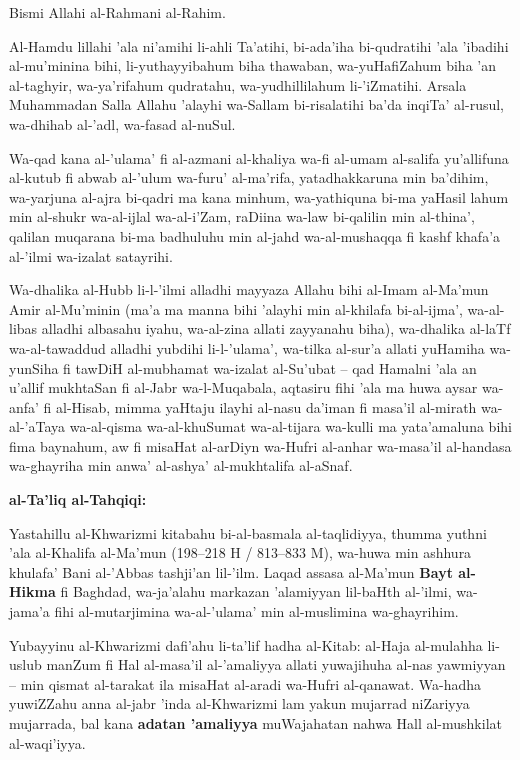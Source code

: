 \documentclass[11pt,a4paper]{book}
\begin{document}
\begin{originaltext}
Bismi Allahi al-Rahmani al-Rahim.

Al-Hamdu lillahi 'ala ni'amihi li-ahli Ta'atihi, bi-ada'iha bi-qudratihi
'ala 'ibadihi al-mu'minina bihi, li-yuthayyibahum biha thawaban,
wa-yuHafiZahum biha 'an al-taghyir, wa-ya'rifahum qudratahu,
wa-yudhillilahum li-'iZmatihi. Arsala Muhammadan Salla Allahu 'alayhi
wa-Sallam bi-risalatihi ba'da inqiTa' al-rusul, wa-dhihab al-'adl,
wa-fasad al-nuSul.

Wa-qad kana al-'ulama' fi al-azmani al-khaliya wa-fi al-umam al-salifa
yu'allifuna al-kutub fi abwab al-'ulum wa-furu' al-ma'rifa, yatadhakkaruna
min ba'dihim, wa-yarjuna al-ajra bi-qadri ma kana minhum, wa-yathiquna
bi-ma yaHasil lahum min al-shukr wa-al-ijlal wa-al-i'Zam, raDiina
wa-law bi-qalilin min al-thina', qalilan muqarana bi-ma badhuluhu min
al-jahd wa-al-mushaqqa fi kashf khafa'a al-'ilmi wa-izalat satayrihi.

Wa-dhalika al-Hubb li-l-'ilmi alladhi mayyaza Allahu bihi al-Imam
al-Ma'mun Amir al-Mu'minin (ma'a ma manna bihi 'alayhi min al-khilafa
bi-al-ijma', wa-al-libas alladhi albasahu iyahu, wa-al-zina allati
zayyanahu biha), wa-dhalika al-laTf wa-al-tawaddud alladhi yubdihi
li-l-'ulama', wa-tilka al-sur'a allati yuHamiha wa-yunSiha fi tawDiH
al-mubhamat wa-izalat al-Su'ubat -- qad Hamalni 'ala an u'allif
mukhtaSan fi al-Jabr wa-l-Muqabala, aqtasiru fihi 'ala ma huwa aysar
wa-anfa' fi al-Hisab, mimma yaHtaju ilayhi al-nasu da'iman fi masa'il
al-mirath wa-al-'aTaya wa-al-qisma wa-al-khuSumat wa-al-tijara wa-kulli
ma yata'amaluna bihi fima baynahum, aw fi misaHat al-arDiyn wa-Hufri
al-anhar wa-masa'il al-handasa wa-ghayriha min anwa' al-ashya'
al-mukhtalifa al-aSnaf.
\end{originaltext}

\begin{commentary}
\textbf{al-Ta'liq al-Tahqiqi:}

Yastahillu al-Khwarizmi kitabahu bi-al-basmala al-taqlidiyya, thumma
yuthni 'ala al-Khalifa al-Ma'mun (198--218 H / 813--833 M), wa-huwa min
ashhura khulafa' Bani al-'Abbas tashji'an lil-'ilm. Laqad assasa
al-Ma'mun \textbf{Bayt al-Hikma} fi Baghdad, wa-ja'alahu markazan
'alamiyyan lil-baHth al-'ilmi, wa-jama'a fihi al-mutarjimina
wa-al-'ulama' min al-muslimina wa-ghayrihim.

Yubayyinu al-Khwarizmi dafi'ahu li-ta'lif hadha al-Kitab: al-Haja
al-mulahha li-uslub manZum fi Hal al-masa'il al-'amaliyya allati
yuwajihuha al-nas yawmiyyan -- min qismat al-tarakat ila misaHat
al-aradi wa-Hufri al-qanawat. Wa-hadha yuwiZZahu anna al-jabr 'inda
al-Khwarizmi lam yakun mujarrad niZariyya mujarrada, bal kana
\textbf{adatan 'amaliyya} muWajahatan nahwa Hall al-mushkilat
al-waqi'iyya.
\end{commentary}
\end{document}
